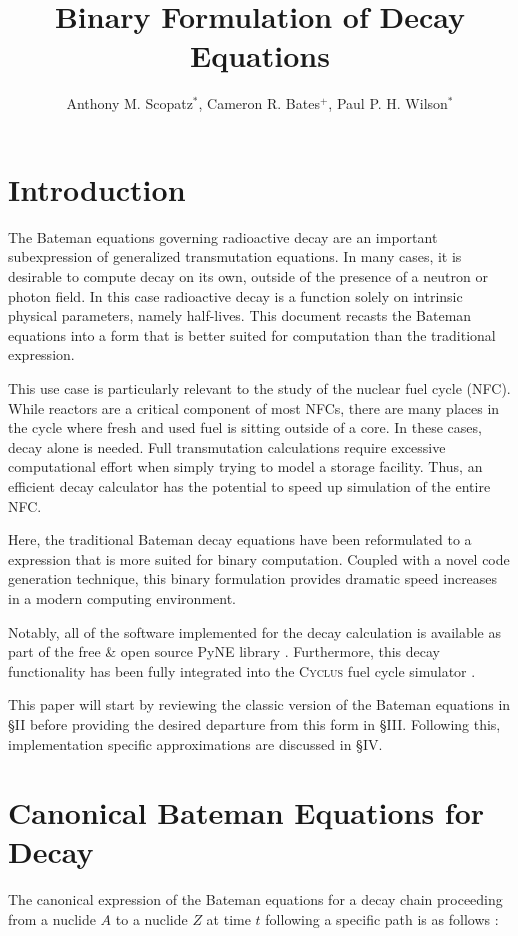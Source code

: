 \documentclass{anstrans}
\title{Binary Formulation of Decay Equations}
\author{Anthony M. Scopatz$^{*}$, Cameron R. Bates$^{+}$, Paul P. H. Wilson$^{*}$}
\institute{
$^{*}$The University of Wisconsin-Madison, 1500 Engineering Drive, Madison,
WI
$^{+}$The University of California Berkeley, Etcheverry Hall, MC 1730, Berkeley, CA
}
\newcommand{\cyclus}{\textsc{Cyclus}\xspace}
\begin{document}
\section{Introduction}

The Bateman equations governing radioactive decay are an important 
subexpression of generalized transmutation equations. In many cases, it is 
desirable to compute decay on its own, outside of the presence of a neutron 
or photon field.  In this case radioactive decay is a function solely on 
intrinsic physical parameters, namely half-lives. This document recasts the 
Bateman equations into a form that is better suited for computation than the 
traditional expression.

This use case is particularly relevant to the study of the nuclear fuel 
cycle (NFC). While reactors are a critical component of most NFCs, there 
are many places in the cycle where fresh and used fuel is sitting outside 
of a core. In these cases, decay alone is needed. Full transmutation 
calculations require excessive computational effort when simply trying to 
model a storage facility. Thus, an efficient decay calculator has the 
potential to speed up simulation of the entire NFC.

Here, the traditional Bateman decay equations have been reformulated to 
a expression that is more suited for binary computation. Coupled with a 
novel code generation technique, this binary formulation provides 
dramatic speed increases in a modern computing environment. 

Notably, all of the software implemented for the decay calculation is 
available as part of the free \& open source PyNE library 
\cite{pyne2014,Bates2014}. Furthermore, this decay functionality has
been fully integrated into the \cyclus fuel cycle simulator
\cite{cyclus2015,cyclus_v1.2}.

This paper will start by reviewing the classic version of the Bateman 
equations in \S II before providing the desired departure from 
this form in \S III. Following this, implementation specific 
approximations are discussed in \S IV.

\section{Canonical Bateman Equations for Decay}
\label{canon}
The canonical expression of the Bateman equations for a decay chain 
proceeding from a nuclide $A$ to a nuclide $Z$ at time 
$t$ following a specific path is as follows \cite{Cetnar2006640}:
\end{document}
